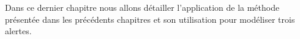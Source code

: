 Dans ce dernier chapitre nous allons détailler l’application de la
méthode présentée dans les précédents chapitres et son utilisation
pour modéliser trois alertes.

